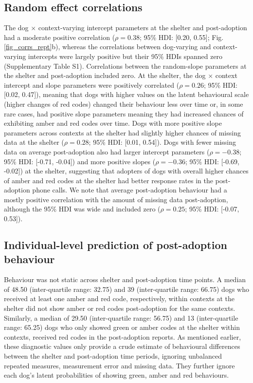 \documentclass[fleqn,10pt]{wlscirep}
\begin{document}
\subsection*{Random effect correlations}
The dog $\times$ context-varying intercept parameters at the shelter and post-adoption had a moderate positive correlation ($\rho = 0.38$; 95\% HDI: [0.20, 0.55]; Fig. \ref{fig_corrs_rept}b), whereas the correlations between dog-varying and context-varying intercepts were largely positive but their 95\% HDIs spanned zero (Supplementary Table S1). Correlations between the random-slope parameters at the shelter and post-adoption included zero. At the shelter, the dog $\times$ context intercept and slope parameters were positively correlated ($\rho = 0.26$; 95\% HDI: [0.02, 0.47]), meaning that dogs with higher values on the latent behavioural scale (higher changes of red codes) changed their behaviour less over time or, in some rare cases, had positive slope parameters meaning they had increased chances of exhibiting amber and red codes over time. Dogs with more positive slope parameters across contexts at the shelter had slightly higher chances of missing data at the shelter ($\rho = 0.28$; 95\% HDI: [0.01, 0.54]). Dogs with fewer missing data on average post-adoption also had larger intercept parameters ($\rho = -0.38$; 95\% HDI: [-0.71, -0.04]) and more positive slopes ($\rho = -0.36$; 95\% HDI: [-0.69, -0.02]) at the shelter, suggesting that adopters of dogs with overall higher chances of amber and red codes at the shelter had better response rates in the post-adoption phone calls. We note that average post-adoption behaviour had a mostly positive correlation with the amount of missing data post-adoption, although the 95\% HDI was wide and included zero ($\rho = 0.25$; 95\% HDI: [-0.07, 0.53]).

\subsection*{Individual-level prediction of post-adoption behaviour}
Behaviour was not static across shelter and post-adoption time points. A median of 48.50 (inter-quartile range: 32.75) and 39 (inter-quartile range: 66.75) dogs who received at least one amber and red code, respectively, within contexts at the shelter did not show amber or red codes post-adoption for the same contexts. Similarly, a median of 29.50 (inter-quartile range: 56.75) and 13 (inter-quartile range: 65.25) dogs who only showed green or amber codes at the shelter within contexts, received red codes in the post-adoption reports. As mentioned earlier, these diagnostic values only provide a crude estimate of behavioural differences between the shelter and post-adoption time periods, ignoring unbalanced repeated measures, measurement error and missing data. They further ignore each dog's latent probabilities of showing green, amber and red behaviours.
\end{document}

